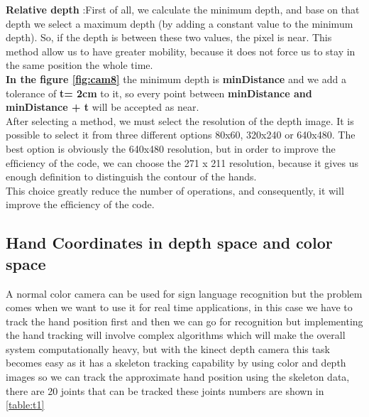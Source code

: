 \textbf{Relative depth }:First of all,  we calculate the minimum depth, and  base on that depth we select a maximum depth (by adding a constant value to the minimum depth). So, if the depth is between these two values, the pixel is near. This method allow us to have greater mobility, because it does not force us to stay in the same position the whole time. 
\\


\textbf{In the figure \ref{fig:cam8}} the minimum depth is \textbf{minDistance} and we add a tolerance of\textbf{  t= 2cm }to it, so every point between \textbf{minDistance and minDistance + t }  will be accepted as near.\\

After selecting a method, we must select the resolution of the depth image. It is possible to select it from three different  options 80x60, 320x240 or 640x480. The best option is obviously the 640x480 resolution, but in order to improve the efﬁciency of the code, we can choose the 271 x 211 resolution, because it gives us enough deﬁnition to distinguish the contour  of the hands. \\This choice greatly reduce the number of operations, and consequently, it will improve the efﬁciency of the code.

\subsection{Hand Coordinates in depth space and color space }
A normal color camera can be used for sign language recognition but the problem comes when we want to use it for real time applications, in this case we have to track the hand position first and then we can go for recognition but implementing the hand tracking will involve complex algorithms which will make the overall system  computationally heavy, but with the kinect depth camera this task becomes easy as it has a skeleton tracking capability by using color and depth images so we can track the approximate hand position using the skeleton data, there are 20 joints that can be tracked these joints numbers are shown in \ref{table:t1}\\

